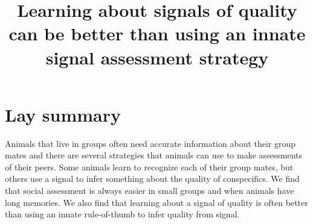 




\noindent
\title{Learning about signals of quality can be better than using an innate signal assessment strategy} 
\author{}
\date{} 
\maketitle


\linenumbers

\section*{Lay summary}
Animals that live in groups often need accurate information about their group mates and there are several strategies that animals can use to make assessments of their peers. Some animals learn to recognize each of their group mates, but others use a signal to infer something about the quality of conspecifics. We find that social assessment is always easier in small groups and when animals have long memories. We also find that learning about a signal of quality is often better than using an innate rule-of-thumb to infer quality from signal.




